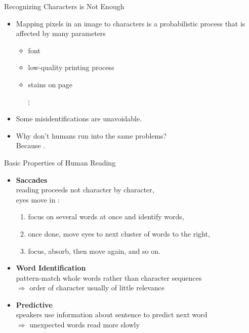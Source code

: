 \documentclass[professionalfonts, xcolor={usenames,svgnames,x11names,table}]{beamer}
\begin{document}
\begin{frame}{Recognizing Characters is Not Enough}
    \begin{itemize}
        \item Mapping pixels in an image to characters is a probabilistic process that is affected by many parameters
            \begin{itemize}
                \item font
                \item low-quality printing process
                \item stains on page
                \item[$\vdots$]
            \end{itemize}
        \item Some misidentifications are unavoidable.
        \item Why don't humans run into the same problems?\\
            Because .
    \end{itemize}
\end{frame}

\begin{frame}{Basic Properties of Human Reading}
    \begin{itemize}
        \item \textbf{Saccades}\\
            reading proceeds not character by character,\\
            eyes move in :
            \begin{enumerate}
                \item focus on several words at once and identify words,
                \item once done, move eyes to next cluster of words to the right,
                \item focus, absorb, then move again, and so on.
            \end{enumerate}
        \item \textbf{Word Identification}\\
            pattern-match whole words rather than character sequences\\
            $\Rightarrow$ order of character usually of little relevance
            \begin{center}
            \end{center}
        \item \textbf{Predictive}\\
            speakers use information about sentence to predict next word\\
            $\Rightarrow$ unexpected words read more slowly
    \end{itemize}
\end{frame}
\end{document}
